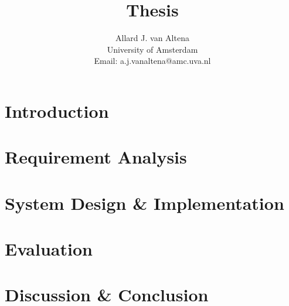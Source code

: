 \documentclass[a4paper]{report}
\title{Thesis}
\author{
	Allard J. van Altena\\
	University of Amsterdam\\
	Email: a.j.vanaltena@amc.uva.nl
}
\newif\ifstructure
\begin{document}
	
	\tableofcontents
	
	\chapter{Introduction}
	\label{introduction}
	
	\ifstructure
		
	\else
		
	\fi
	
	\chapter{Requirement Analysis}
	\label{requirements}
	
	\ifstructure
		
		
		
	\else
		
		
		
		
		
		
	\fi
	
	\chapter{System Design \& Implementation}
	\label{system-functionality}
	
	\ifstructure
		
		
		
	\else
		
		
		
	\fi
	
	\chapter{Evaluation}
	\label{evaluation}
	
	\ifstructure
		
	\else
		
	\fi
	
	\chapter{Discussion \& Conclusion}
	\label{discussion}
	
	\ifstructure
		
	\else
		
	\fi
	
\end{document}
